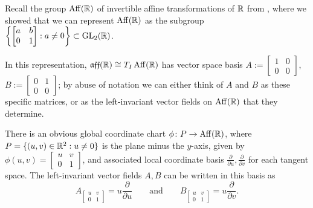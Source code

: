 \begin{example}\label{ex:Lie algebra of affine group}
	Recall the group $\operatorname{Aff}(\mathbb{R})$ of invertible affine transformations of $\mathbb{R}$ from , where we showed that we can represent $\operatorname{Aff}(\mathbb{R})$ as the subgroup $\left\{ \begin{bmatrix} a & b \\ 0 & 1 \end{bmatrix} : a \neq 0 \right\} \subset \operatorname{GL}_2(\mathbb{R})$.
	
	In this representation, $\mathfrak{aff}(\mathbb{R}) \cong T_I \operatorname{Aff}(\mathbb{R})$ has vector space basis $A := \begin{bmatrix} 1 & 0 \\ 0 & 0 \end{bmatrix}$, $B := \begin{bmatrix} 0 & 1 \\ 0 & 0 \end{bmatrix}$; by abuse of notation we can either think of $A$ and $B$ as these specific matrices, or as the left-invariant vector fields on $\operatorname{Aff}(\mathbb{R})$ that they determine.
	
	\begin{exercise}\label{ex:coords on affine group}
		There is an obvious global coordinate chart $\phi \colon\thinspace\! P \to \operatorname{Aff}(\mathbb{R})$, where $P = \{(u,v) \in \mathbb{R}^2 : u \neq 0\}$ is the plane minus the $y$-axis, given by $\phi(u,v) = \begin{bmatrix}u & v \\ 0 & 1 \end{bmatrix}$, and associated local coordinate basis $\frac{\partial}{\partial u}, \frac{\partial}{\partial v}$ for each tangent space. The left-invariant vector fields $A,B$ can be written in this basis as
		\begin{equation}\label{eq:affine coords}
			A_{\begin{bmatrix} u & v \\ 0 & 1 \end{bmatrix}} = u \frac{\partial}{\partial u} \qquad \text{and} \qquad B_{\begin{bmatrix} u & v \\ 0 & 1 \end{bmatrix}} = u \frac{\partial }{\partial v}.
		\end{equation}
	\end{exercise}
	

\end{example}
